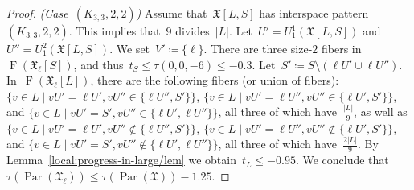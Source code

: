 \documentclass[english,a4paper]{article}
\theoremstyle{plain}
\theoremstyle{definition}
\newcommand{\abs}[1]{| #1 |}
\DeclareMathOperator{\Fibers}{F}
\newcommand{\coherentConfig}{\ensuremath{\mathfrak{X}}}
\newcommand{\fibers}[1]{\ensuremath{\Fibers \left( #1 \right)}}
\newcommand{\interspace}[2]{\ensuremath{\coherentConfig[#1,#2]}}
\DeclareMathOperator{\parameters}{Par}
\newcommand{\ipsixTriangleComplementTwice}{\ensuremath{(\clique{3,3},2,2)}}
\newcommand{\clique}[1]{\ensuremath{K_{#1}}}
\begin{document}
\begin{proof}
    \textit{(Case~$\ipsixTriangleComplementTwice$)}
    Assume that~$\interspace{L}{S}$ has interspace pattern~$\ipsixTriangleComplementTwice$.
    This implies that~$9$ divides~$|L|$.
    Let~$U' = U^1_1(\interspace{L}{S})$ and~$U'' = U^2_1(\interspace{L}{S})$.
    We set~$V' \coloneqq \{\ell\}$.
    There are three size-$2$ fibers in~$\fibers{\coherentConfig_\ell[S]}$, and thus~$t_S \leq \tau(0,0,-6) \leq -0.3$.
    Let~$S' \coloneqq S \setminus (\ell U' \cup \ell U'')$.
    In~$\fibers{\coherentConfig_\ell[L]}$, there are the following fibers (or union of fibers):
    $\{v \in L \mid v U' = \ell U',  v U'' \in \{\ell U'', S'      \} \}$,
    $\{v \in L \mid v U' = \ell U'', v U'' \in \{\ell U',  S'      \} \}$, and
    $\{v \in L \mid v U' = S',       v U'' \in \{\ell U',  \ell U''\} \}$, all three of which have~$\frac{\abs{L}}{9}$, as well as
    $\{v \in L \mid v U' = \ell U',  v U'' \notin \{\ell U'', S'      \} \}$,
    $\{v \in L \mid v U' = \ell U'', v U'' \notin \{\ell U',  S'      \} \}$, and
    $\{v \in L \mid v U' = S',       v U'' \notin \{\ell U',  \ell U''\} \}$, all three  of which have~$\frac{2\abs{L}}{9}$.
    By Lemma~\ref{local:progress-in-large/lem} we obtain~$t_L \leq -0.95$.
    We conclude that~$\tau(\parameters(\coherentConfig_\ell)) \leq \tau(\parameters(\coherentConfig))- 1.25$.
\end{proof}
\end{document}
